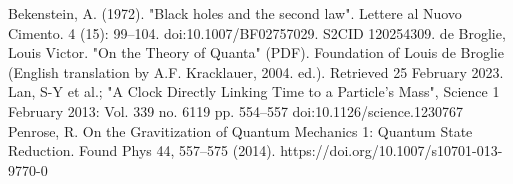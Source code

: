 \documentclass[12pt,a4paper]{article}
\begin{document}
\begin{thebibliography}{10}

 Bekenstein, A. (1972). "Black holes and the second law". Lettere al Nuovo Cimento. 4 (15): 99–104. doi:10.1007/BF02757029. S2CID 120254309.
 de Broglie, Louis Victor. "On the Theory of Quanta" (PDF). Foundation of Louis de Broglie (English translation by A.F. Kracklauer, 2004. ed.). Retrieved 25 February 2023.
  Lan, S-Y et al.; "A Clock Directly Linking Time to a Particle's Mass", Science 1 February 2013: Vol. 339 no. 6119 pp. 554–557 doi:10.1126/science.1230767
 Penrose, R. On the Gravitization of Quantum Mechanics 1: Quantum State Reduction. Found Phys 44, 557–575 (2014). https://doi.org/10.1007/s10701-013-9770-0

\end{thebibliography}
\end{document}
